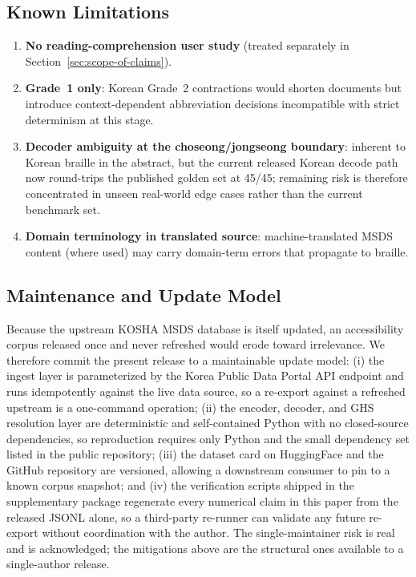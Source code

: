 \documentclass[smallextended]{svjour3}
\begin{document}
\subsection{Known Limitations}

\begin{enumerate}
\item \textbf{No reading-comprehension user study} (treated separately in Section~\ref{sec:scope-of-claims}).
\item \textbf{Grade~1 only}: Korean Grade~2 contractions would shorten documents but introduce context-dependent abbreviation decisions incompatible with strict determinism at this stage.
\item \textbf{Decoder ambiguity at the choseong/jongseong boundary}: inherent to Korean braille in the abstract, but the current released Korean decode path now round-trips the published golden set at 45/45; remaining risk is therefore concentrated in unseen real-world edge cases rather than the current benchmark set.
\item \textbf{Domain terminology in translated source}: machine-translated MSDS content (where used) may carry domain-term errors that propagate to braille.
\end{enumerate}

\subsection{Maintenance and Update Model}
\label{sec:maintenance}

Because the upstream KOSHA MSDS database is itself updated, an accessibility corpus released once and never refreshed would erode toward irrelevance. We therefore commit the present release to a maintainable update model: (i) the ingest layer is parameterized by the Korea Public Data Portal API endpoint and runs idempotently against the live data source, so a re-export against a refreshed upstream is a one-command operation; (ii) the encoder, decoder, and GHS resolution layer are deterministic and self-contained Python with no closed-source dependencies, so reproduction requires only Python and the small dependency set listed in the public repository; (iii) the dataset card on HuggingFace and the GitHub repository are versioned, allowing a downstream consumer to pin to a known corpus snapshot; and (iv) the verification scripts shipped in the supplementary package regenerate every numerical claim in this paper from the released JSONL alone, so a third-party re-runner can validate any future re-export without coordination with the author. The single-maintainer risk is real and is acknowledged; the mitigations above are the structural ones available to a single-author release.
\end{document}
